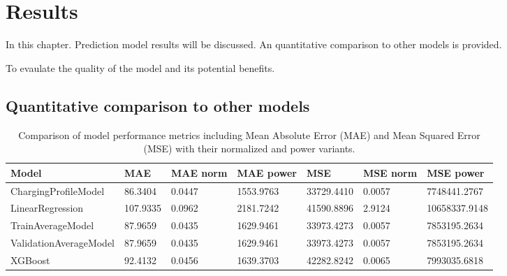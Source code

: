 \setchapterpreamble[u]{\margintoc}

\setchapterpreamble[u]{\margintoc}
\chapter{Results}


In this chapter. Prediction model results will be discussed. An quantitative comparison to other models is provided.

To evaulate the quality of the model and its potential benefits.

\section{Quantitative comparison to other models}
\label{sec:res-comparison}


\begin{table*}[h!]
    \caption{Comparison of model performance metrics including Mean Absolute Error (MAE) and Mean Squared Error (MSE) with their normalized and power variants.}
    \label{tab:my-table}
    \begin{tabular}{p{3.3cm} p{1.5cm} p{1.8cm} p{2.2cm} p{1.5cm} p{1.8cm} p{2.2cm}}
        \toprule
        \textbf{Model}         & \textbf{MAE} & \textbf{MAE norm} & \textbf{MAE power} & \textbf{MSE} & \textbf{MSE norm} & \textbf{MSE power} \\
        \midrule
        ChargingProfileModel   & 86.3404      & 0.0447            & 1553.9763          & 33729.4410   & 0.0057            & 7748441.2767       \\
        LinearRegression       & 107.9335     & 0.0962            & 2181.7242          & 41590.8896   & 2.9124            & 10658337.9148      \\
        TrainAverageModel      & 87.9659      & 0.0435            & 1629.9461          & 33973.4273   & 0.0057            & 7853195.2634       \\
        ValidationAverageModel & 87.9659      & 0.0435            & 1629.9461          & 33973.4273   & 0.0057            & 7853195.2634       \\
        XGBoost                & 92.4132      & 0.0456            & 1639.3703          & 42282.8242   & 0.0065            & 7993035.6818       \\
        \bottomrule
    \end{tabular}
\end{table*}
